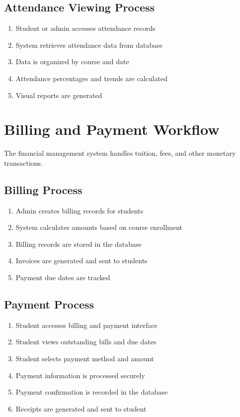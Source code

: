 \subsection{Attendance Viewing Process}

\begin{enumerate}
    \item Student or admin accesses attendance records
    \item System retrieves attendance data from database
    \item Data is organized by course and date
    \item Attendance percentages and trends are calculated
    \item Visual reports are generated
\end{enumerate}

\section{Billing and Payment Workflow}

The financial management system handles tuition, fees, and other monetary transactions.

\subsection{Billing Process}

\begin{enumerate}
    \item Admin creates billing records for students
    \item System calculates amounts based on course enrollment
    \item Billing records are stored in the database
    \item Invoices are generated and sent to students
    \item Payment due dates are tracked
\end{enumerate}

\subsection{Payment Process}

\begin{enumerate}
    \item Student accesses billing and payment interface
    \item Student views outstanding bills and due dates
    \item Student selects payment method and amount
    \item Payment information is processed securely
    \item Payment confirmation is recorded in the database
    \item Receipts are generated and sent to student
\end{enumerate}

